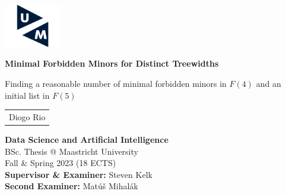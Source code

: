 \begin{titlepage}

\hspace*{-0.5cm}\includegraphics[width=2.5cm]{images/um-logo.png} \\

\vspace{2cm}

\begin{center}
    
    \vspace{2cm}

    {\huge
    \begin{spacing}{1.0}
        \textbf{Minimal Forbidden Minors for Distinct Treewidths}
    \end{spacing}
    }
        

    \vspace{0.5cm}                                                                              
    {\LARGE
    \begin{spacing}{1.0}
     Finding a reasonable number of minimal forbidden minors in $F(4)$ and an initial list in $F(5)$
    \end{spacing}
    }

    \vspace{2cm}
        
    {\LARGE \renewcommand{\arraystretch}{1.2}
        \begin{tabular}{c}
            Diogo Rio \\
        \end{tabular}
    }
    
\end{center} 


\vfill
\begin{flushleft}
    { \large
    \textbf{Data Science and Artificial Intelligence} \\  
    BSc. Thesis @ Maastricht University \\  
    Fall \& Spring 2023 (18 ECTS) \\ 
    \textbf{Supervisor \& Examiner:} Steven Kelk \\
    \textbf{Second Examiner:} Matúš Mihalák \\
    }
\end{flushleft}

\restoregeometry
\end{titlepage}